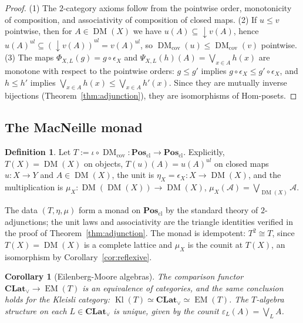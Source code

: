 \documentclass{amsart}
\theoremstyle{plain}
\newtheorem{corollary}{Corollary}[section]
\theoremstyle{definition}
\newtheorem{definition}{Definition}[section]
\theoremstyle{remark}
\DeclareMathOperator{\DM}{DM}
\DeclareMathOperator{\EM}{EM}
\DeclareMathOperator{\Kl}{Kl}
\begin{document}
\begin{proof}
(1) The $2$-category axioms follow from the pointwise order, monotonicity of composition, and associativity of composition of closed maps. (2) If $u\leq v$ pointwise, then for $A\in\DM(X)$ we have $u(A)\subseteq\downarrow v(A)$, hence $u(A)^{ul}\subseteq(\downarrow v(A))^{ul}=v(A)^{ul}$, so $\DM_{\mathrm{cov}}(u)\leq\DM_{\mathrm{cov}}(v)$ pointwise. (3) The maps $\Phi_{X,L}(g)=g\circ\epsilon_X$ and $\Psi_{X,L}(h)(A)=\bigvee_{x\in A}h(x)$ are monotone with respect to the pointwise orders: $g\leq g'$ implies $g\circ\epsilon_X\leq g'\circ\epsilon_X$, and $h\leq h'$ implies $\bigvee_{x\in A}h(x)\leq\bigvee_{x\in A}h'(x)$. Since they are mutually inverse bijections (Theorem~\ref{thm:adjunction}), they are isomorphisms of Hom-posets.
\end{proof}

\subsection{The MacNeille monad}

\begin{definition}\label{def:macneille-monad}
Let $T:=\iota\circ\DM_{\mathrm{cov}}\colon\mathbf{Pos}_{\mathrm{cl}}\to\mathbf{Pos}_{\mathrm{cl}}$. Explicitly, $T(X)=\DM(X)$ on objects, $T(u)(A)=u(A)^{ul}$ on closed maps $u\colon X\to Y$ and $A\in\DM(X)$, the unit is $\eta_X=\epsilon_X\colon X\to\DM(X)$, and the multiplication is $\mu_X\colon\DM(\DM(X))\to\DM(X)$, $\mu_X(\mathcal{A})=\bigvee_{\DM(X)}\mathcal{A}$.
\end{definition}

The data $(T,\eta,\mu)$ form a monad on $\mathbf{Pos}_{\mathrm{cl}}$ by the standard theory of $2$-adjunctions; the unit laws and associativity are the triangle identities verified in the proof of Theorem~\ref{thm:adjunction}. The monad is idempotent: $T^2\cong T$, since $T(X)=\DM(X)$ is a complete lattice and $\mu_X$ is the counit at $T(X)$, an isomorphism by Corollary~\ref{cor:reflexive}.

\begin{corollary}[Eilenberg-Moore algebras]\label{thm:eilenberg-moore-clat}
The comparison functor $\mathbf{CLat}_\vee\to\EM(T)$ is an equivalence of categories, and the same conclusion holds for the Kleisli category: $\Kl(T)\simeq\mathbf{CLat}_\vee\simeq\EM(T)$. The $T$-algebra structure on each $L\in\mathbf{CLat}_\vee$ is unique, given by the counit $\varepsilon_L(A)=\bigvee_L A$.
\end{corollary}
\end{document}
